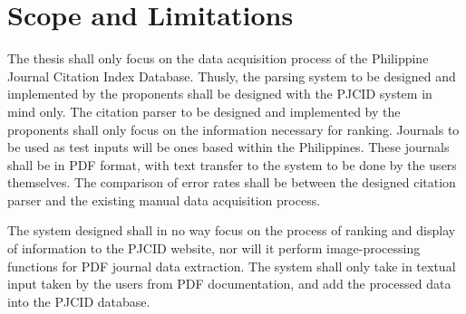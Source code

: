 \section{Scope and Limitations}
The thesis shall only focus on the data acquisition process of the Philippine Journal Citation Index Database. Thusly, the parsing system to be designed and implemented by the proponents shall be designed with the PJCID system in mind only. The citation parser to be designed and implemented by the proponents shall only focus on the information necessary for ranking. Journals to be used as test inputs will be ones based within the Philippines. These journals shall be in PDF format, with text transfer to the system to be done by the users themselves. The comparison of error rates shall be between the designed citation parser and the existing manual data acquisition process.

The system designed shall in no way focus on the process of ranking and display of information to the PJCID website, nor will it perform image-processing functions for PDF journal data extraction. The system shall only take in textual input taken by the users from PDF documentation, and add the processed data into the PJCID database. 